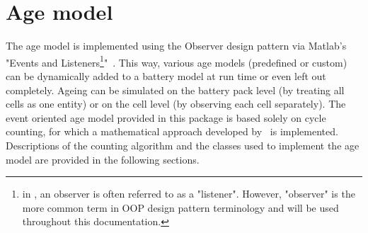 \section{Age model}
The age model is implemented using the Observer design pattern via Matlab's "Events and Listeners\footnote{in \matlab, an observer is often referred to as a "listener". However, "observer" is the more common term in OOP design pattern terminology and will be used throughout this documentation.}"~\cite{_overview_????}. This way, various age models (predefined or custom) can be dynamically added to a battery model at run time or even left out completely. Ageing can be simulated on the battery pack level (by treating all cells as one entity) or on the cell level (by observing each cell separately). The event oriented age model provided in this package is based solely on cycle counting, for which a mathematical approach developed by~\cite{dambrowski_mathematical_2012} is implemented. Descriptions of the counting algorithm and the classes used to implement the age model are provided in the following sections.
